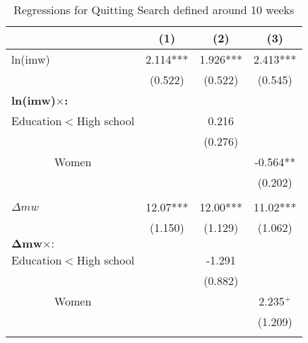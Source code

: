 \documentclass{article}
\begin{document}
\begin{table}
	\centering
	\caption{Regressions for Quitting Search defined around 10 weeks}
	\begin{tabular}{rrccc}
		
		&            &        (1) &        (2) &        (3) \\
		\hline
		\hline
		\multicolumn{ 2}{l}{ln(imw)} &  2.114***&1.926***&2.413***\\
		
		&		&(0.522)&(0.522)&(0.545)\\
		
		\multicolumn{ 2}{l}{{\bf ln(imw)$\times$:}} &            &            &          \\
		
		\multicolumn{ 2}{r}{Education$<$High school} &            &     0.216 &            \\
		
		&            &            &    (0.276) &            \\
		
		\multicolumn{ 2}{c}{Women} &            &            &   -0.564** \\
		
		&            &            &            &     (0.202) \\
		&&&&\\
		
		\multicolumn{ 2}{l}{\bf $\Delta mw$} &  12.07***&12.00***&11.02*** \\
		
		&		&(1.150)&(1.129)&(1.062)\\
		
		\multicolumn{ 2}{l}{$\mathbf{\Delta mw \times:}$} &            &            &           \\
		
		\multicolumn{ 2}{r}{Education$<$High school} &            &   -1.291 &            \\
		
		&            &            &    (0.882) &            \\
		
		\multicolumn{ 2}{c}{Women} &            &            &    2.235$^+$ \\
		
		&            &            &            &     (1.209) \\\hdashline
		

\end{tabular}
\end{table}
\end{document}
